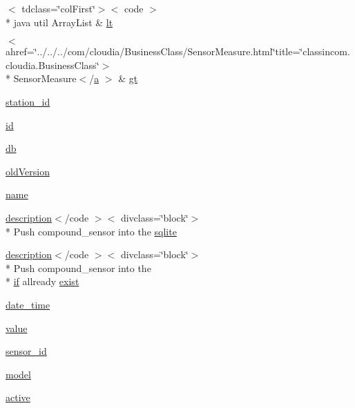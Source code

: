 \begin{DoxyCompactItemize}
$<$ tdclass=\char`\"{}col\-First\char`\"{}$>$$<$ code $>$\\*
 java util Array\-List \& \hyperlink{_cloudia_d_b_8html_a6046ea68583de5557b637104e82142fd}{lt}
\item 
$<$ ahref=\char`\"{}../../../com/cloudia/Business\-Class/Sensor\-Measure.\-html\char`\"{}title=\char`\"{}classincom.\-cloudia.\-Business\-Class\char`\"{}$>$\\*
 Sensor\-Measure$<$/\hyperlink{style_8css_a5e8981582017bb8b84c21f148345d1f7}{a} $>$ \& \hyperlink{_cloudia_d_b_8html_a7ee70caa890833ed68e0c07ad3b6ce0d}{gt}
\item 
\hyperlink{_cloudia_d_b_8html_a94879ab2dcd5ce6500f7cfc8503394ef}{station\-\_\-id}
\item 
\hyperlink{_cloudia_d_b_8html_acf2488b95c97e0378c9bf49de3b50f28}{id}
\item 
\hyperlink{_cloudia_d_b_8html_a89a7f6028a19c3dc081cc5f16eb53891}{db}
\item 
\hyperlink{_cloudia_d_b_8html_ae74b2c5e87ac6793ce49c8edfa694a35}{old\-Version}
\item 
\hyperlink{_cloudia_d_b_8html_ab74e6bf80237ddc4109968cedc58c151}{name}
\item 
\hyperlink{_cloudia_d_b_8html_a2661f439a4a94ffdcd5e47ae1da0bb1d}{description}$<$/code $>$$<$ divclass=\char`\"{}block\char`\"{}$>$\\*
 Push compound\-\_\-sensor into the \hyperlink{_cloudia_d_b_8html_a57daf693de1cf9008cc440b7a984a5b4}{sqlite}
\item 
\hyperlink{_cloudia_d_b_8html_a2661f439a4a94ffdcd5e47ae1da0bb1d}{description}$<$/code $>$$<$ divclass=\char`\"{}block\char`\"{}$>$\\*
 Push compound\-\_\-sensor into the \\*
\hyperlink{index_8html_ac3319c4d3988ba4dde95186b368963f2}{if} allready \hyperlink{_cloudia_d_b_8html_a28694d6558e48780d64566a2daec14db}{exist}
\item 
\hyperlink{_cloudia_d_b_8html_a2ebe356a2a4f9bab3a6c50f65ccc86d5}{date\-\_\-time}
\item 
\hyperlink{_cloudia_d_b_8html_afcc7a4b78ecd8fa7e713f8cfa0f51017}{value}
\item 
\hyperlink{_cloudia_d_b_8html_a48a4081a48bf69abc4ba5d704ec33919}{sensor\-\_\-id}
\item 
\hyperlink{_cloudia_d_b_8html_a508cc3106d2c29fe07dc87cbe3ea6927}{model}
\item 
\hyperlink{_cloudia_d_b_8html_aaebf392084a5bb0210fa5b154954895b}{active}
\item 
$$
\end{DoxyCompactItemize}
